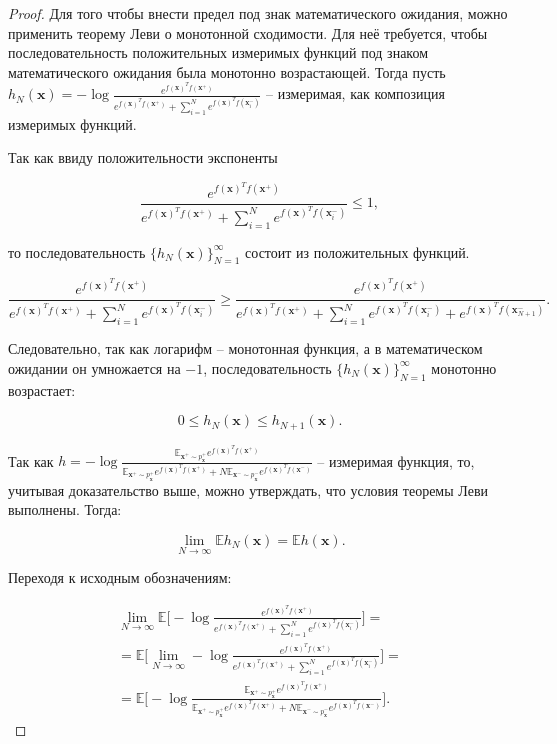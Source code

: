 \documentclass[a4paper, 14pt]{article}
\begin{document}
\renewcommand\qedsymbol{$\blacksquare$}
\begin{proof}
Для того чтобы внести предел под знак математического ожидания, можно применить теорему Леви о монотонной сходимости. Для неё требуется, чтобы последовательность положительных измеримых функций под знаком математического ожидания была монотонно возрастающей. Тогда пусть $h_N(\mathbf{x}) = - \log \frac{e^{f(\textbf{x})^T f(\textbf{x}^+)}}{e^{f(\textbf{x})^T f(\textbf{x}^+)} + \sum_{i=1}^N e^{f(\textbf{x})^T f(\textbf{x}_i^-)}}$ -- измеримая, как композиция измеримых функций.

Так как ввиду положительности экспоненты

\[\frac{e^{f(\textbf{x})^T f(\textbf{x}^+)}}{e^{f(\textbf{x})^T f(\textbf{x}^+)} + \sum_{i=1}^N e^{f(\textbf{x})^T f(\textbf{x}_i^-)}} \leq 1,\]

\noindent то последовательность $\{h_N(\mathbf{x})\}_{N=1}^{\infty}$ состоит из положительных функций.

\[\frac{e^{f(\textbf{x})^T f(\textbf{x}^+)}}{e^{f(\textbf{x})^T f(\textbf{x}^+)} + \sum_{i=1}^N e^{f(\textbf{x})^T f(\textbf{x}_i^-)}} \geq \frac{e^{f(\textbf{x})^T f(\textbf{x}^+)}}{e^{f(\textbf{x})^T f(\textbf{x}^+)} + \sum_{i=1}^N e^{f(\textbf{x})^T f(\textbf{x}_i^-)} + e^{f(\textbf{x})^T f(\textbf{x}_{N+1}^-)}}.\]

Следовательно, так как логарифм -- монотонная функция, а в математическом ожидании он умножается на $-1$, последовательность $\{h_N(\mathbf{x})\}_{N=1}^{\infty}$ монотонно возрастает:

\[0 \leq h_N(\mathbf{x}) \leq h_{N+1}(\mathbf{x}).\]

Так как $h = - \log \frac{\mathbb{E}_{\textbf{x}^+ \sim p_\mathbf{x}^+} e^{f(\textbf{x})^T f(\textbf{x}^+)}}{\mathbb{E}_{\textbf{x}^+ \sim p_\mathbf{x}^+} e^{f(\textbf{x})^T f(\textbf{x}^+)} + N \mathbb{E}_{\textbf{x}^- \sim p_\mathbf{x}^-} e^{f(\textbf{x})^T f(\textbf{x}^-)}}$ -- измеримая функция, то, учитывая доказательство выше, можно утверждать, что условия теоремы Леви выполнены. Тогда:

\[\lim\limits_{N \to \infty} \mathbb{E} h_N(\mathbf{x}) = \mathbb{E} h(\mathbf{x}).\]

Переходя к исходным обозначениям:

\begin{equation}
\begin{split}
\lim_{N \to \infty} \mathbb{E} \bigg[ - \log \frac{e^{f(\textbf{x})^T f(\textbf{x}^+)}}{e^{f(\textbf{x})^T f(\textbf{x}^+)} + \sum_{i=1}^N e^{f(\textbf{x})^T f(\textbf{x}_i^-)}} \bigg] = \\
= \mathbb{E} \bigg[ \lim_{N \to \infty} - \log \frac{e^{f(\textbf{x})^T f(\textbf{x}^+)}}{e^{f(\textbf{x})^T f(\textbf{x}^+)} + \sum_{i=1}^N e^{f(\textbf{x})^T f(\textbf{x}_i^-)}} \bigg] = \\
= \mathbb{E} \bigg[ - \log \frac{\mathbb{E}_{\textbf{x}^+ \sim p_\mathbf{x}^+} e^{f(\textbf{x})^T f(\textbf{x}^+)}}{\mathbb{E}_{\textbf{x}^+ \sim p_\mathbf{x}^+} e^{f(\textbf{x})^T f(\textbf{x}^+)} + N \mathbb{E}_{\textbf{x}^- \sim p_\mathbf{x}^-} e^{f(\textbf{x})^T f(\textbf{x}^-)}}\bigg].
\end{split}
\end{equation}


\end{proof}
\end{document}
